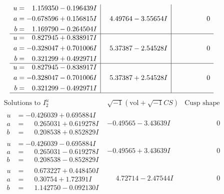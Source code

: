 \documentclass[1p]{elsarticle_modified}
\theoremstyle{definition}
\newcommand{\I}{\sqrt{-1}}
\begin{document}
$$\begin{array}{c|c|c}
\begin{aligned}
u &= \phantom{-}1.159350 - 0.196439 I \\
a &= -0.678596 + 0.156815 I \\
b &= \phantom{-}1.169790 - 0.264504 I\end{aligned}
 & \phantom{-}4.49764 - 3.55654 I & \phantom{-0.000000 } 0 \\ \hline\begin{aligned}
u &= \phantom{-}0.827945 + 0.838917 I \\
a &= -0.328047 + 0.701006 I \\
b &= \phantom{-}0.321299 + 0.492971 I\end{aligned}
 & \phantom{-}5.37387 - 2.54528 I & \phantom{-0.000000 } 0 \\ \hline\begin{aligned}
u &= \phantom{-}0.827945 - 0.838917 I \\
a &= -0.328047 - 0.701006 I \\
b &= \phantom{-}0.321299 - 0.492971 I\end{aligned}
 & \phantom{-}5.37387 + 2.54528 I & \phantom{-0.000000 } 0\\
 \hline 
 \end{array}$$\newpage$$\begin{array}{c|c|c}  
\text{Solutions to }I^u_{2}& \I (\text{vol} + \sqrt{-1}CS) & \text{Cusp shape}\\
 \hline 
\begin{aligned}
u &= -0.426039 + 0.695884 I \\
a &= \phantom{-}0.265031 + 0.619278 I \\
b &= \phantom{-}0.208538 + 0.852829 I\end{aligned}
 & -0.49565 - 3.43639 I & \phantom{-0.000000 } 0 \\ \hline\begin{aligned}
u &= -0.426039 - 0.695884 I \\
a &= \phantom{-}0.265031 - 0.619278 I \\
b &= \phantom{-}0.208538 - 0.852829 I\end{aligned}
 & -0.49565 + 3.43639 I & \phantom{-0.000000 } 0 \\ \hline\begin{aligned}
u &= \phantom{-}0.673227 + 0.448450 I \\
a &= \phantom{-}0.30754 + 1.72391 I \\
b &= \phantom{-}1.142750 - 0.092130 I\end{aligned}
 & \phantom{-}4.72714 - 2.47544 I & \phantom{-0.000000 } 0 \\ \hline\begin{aligned}

\end{aligned}
\end{array}$$
\end{document}
